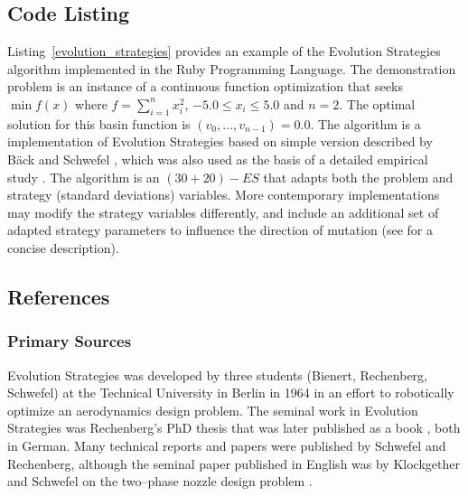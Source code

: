 \subsection{Code Listing}
Listing~\ref{evolution_strategies} provides an example of the Evolution Strategies algorithm implemented in the Ruby Programming Language.
The demonstration problem is an instance of a continuous function optimization that seeks $\min f(x)$ where $f=\sum_{i=1}^n x_{i}^2$, $-5.0\leq x_i \leq 5.0$ and $n=2$. The optimal solution for this basin function is $(v_0,\ldots,v_{n-1})=0.0$.
The algorithm is a implementation of Evolution Strategies based on simple version described by B\"ack and Schwefel \cite{Back1993b}, which was also used as the basis of a detailed empirical study \cite{Yao1997}.
The algorithm is an $(30+20)-ES$ that adapts both the problem and strategy (standard deviations) variables. 
More contemporary implementations may modify the strategy variables differently, and include an additional set of adapted strategy parameters to influence the direction of mutation (see \cite{Rudolph2000} for a concise description).




\subsection{References}

% 
% 
\subsubsection{Primary Sources}
Evolution Strategies was developed by three students (Bienert, Rechenberg, Schwefel) at the Technical University in Berlin in 1964 in an effort to robotically optimize an aerodynamics design problem.
The seminal work in Evolution Strategies was Rechenberg's PhD thesis \cite{Rechenberg1971} that was later published as a book \cite{Rechenberg1973}, both in German.
Many technical reports and papers were published by Schwefel and Rechenberg, although the seminal paper published in English was by Klockgether and Schwefel on the two--phase nozzle design problem \cite{Klockgether1970}.

